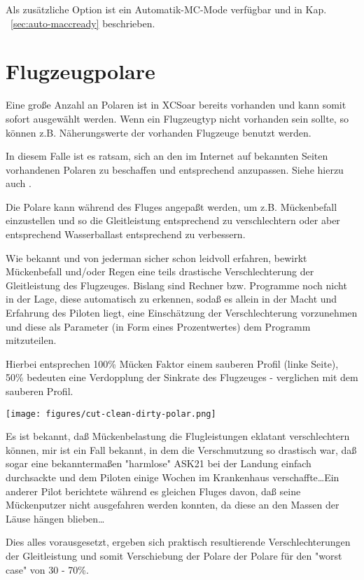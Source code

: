 Als zusätzliche Option ist ein Automatik-MC-Mode verfügbar und in Kap. ~\ref{sec:auto-maccready} beschrieben.

\section{Flugzeugpolare}

Eine große Anzahl an Polaren ist in \textsf{XCSoar} bereits vorhanden und kann
somit sofort  ausgewählt werden. Wenn ein Flugzeugtyp nicht vorhanden sein
sollte, so können z.B. Näherungswerte der vorhanden  Flugzeuge benutzt werden.

In diesem Falle ist es ratsam, sich an den im Internet auf bekannten Seiten
vorhandenen Polaren zu beschaffen und entsprechend anzupassen. Siehe hierzu
auch .

Die Polare kann während des Fluges angepaßt werden, um z.B. Mückenbefall einzustellen
und so die Gleitleistung entsprechend zu verschlechtern oder aber entsprechend Wasserballast entsprechend zu verbessern.

Wie bekannt und von jederman sicher schon leidvoll erfahren, bewirkt
Mückenbefall und/oder  Regen eine teils drastische  Verschlechterung der
Gleitleistung des Flugzeuges. Bislang sind Rechner bzw. Programme noch nicht in
der Lage, diese automatisch zu erkennen, sodaß es allein in der Macht und
Erfahrung des Piloten liegt, eine Einschätzung der Verschlechterung vorzunehmen
und diese als Parameter (in Form eines Prozentwertes) dem Programm mitzuteilen.

Hierbei entsprechen 100\% Mücken Faktor einem sauberen Profil (linke Seite), 50\% bedeuten eine Verdopplung der
Sinkrate des Flugzeuges - verglichen mit dem sauberen Profil.

\begin{center}
\texttt{[image: figures/cut-clean-dirty-polar.png]}
\end{center}

Es ist bekannt, daß Mückenbelastung die Flugleistungen eklatant verschlechtern können, mir ist ein Fall bekannt, in dem die
Verschmutzung so drastisch war, daß sogar eine bekanntermaßen "harmlose" ASK21 bei der Landung einfach durchsackte und
dem Piloten einige Wochen im Krankenhaus verschaffte\dots Ein anderer Pilot berichtete während es gleichen Fluges davon, daß seine
Mückenputzer nicht ausgefahren werden konnten, da diese an den Massen der Läuse hängen blieben\dots

Dies alles vorausgesetzt, ergeben sich praktisch resultierende Verschlechterungen der Gleitleistung und somit Verschiebung
der Polare der Polare für den "worst case" von 30 - 70\%.

